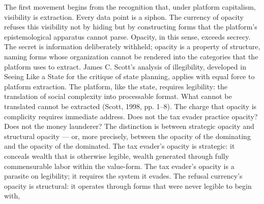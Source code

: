 The first movement begins from the recognition that, under platform capitalism, visibility is extraction. Every data point is a siphon. The currency of opacity refuses this visibility not by hiding but by constructing forms that the platform’s epistemological apparatus cannot parse. Opacity, in this sense, exceeds secrecy. The secret is information deliberately withheld; opacity is a property of structure, naming forms whose organization cannot be rendered into the categories that the platform uses to extract. James C. Scott’s analysis of illegibility, developed in Seeing Like a State for the critique of state planning, applies with equal force to platform extraction. The platform, like the state, requires legibility: the translation of social complexity into processable format. What cannot be translated cannot be extracted (Scott, 1998, pp. 1–8). The charge that opacity is complicity requires immediate address. Does not the tax evader practice opacity? Does not the money launderer? The distinction is between strategic opacity and structural opacity — or, more precisely, between the opacity of the dominating and the opacity of the dominated. The tax evader’s opacity is strategic: it conceals wealth that is otherwise legible, wealth generated through fully commensurable labor within the value-form. The tax evader’s opacity is a parasite on legibility; it requires the system it evades. The refusal currency’s opacity is structural: it operates through forms that were never legible to begin with,

